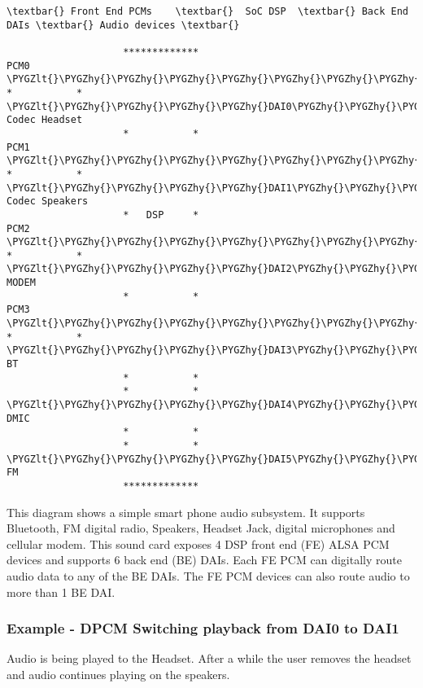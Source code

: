 \documentclass[a4paper,8pt,english]{sphinxmanual}
\def\PYGZlt{\char`\<}
\def\PYGZgt{\char`\>}
\def\PYGZhy{\char`\-}
\begin{document}
\begin{Verbatim}[commandchars=\\\{\}]
\textbar{} Front End PCMs    \textbar{}  SoC DSP  \textbar{} Back End DAIs \textbar{} Audio devices \textbar{}

                    *************
PCM0 \PYGZlt{}\PYGZhy{}\PYGZhy{}\PYGZhy{}\PYGZhy{}\PYGZhy{}\PYGZhy{}\PYGZhy{}\PYGZhy{}\PYGZhy{}\PYGZhy{}\PYGZhy{}\PYGZhy{}\PYGZgt{} *           * \PYGZlt{}\PYGZhy{}\PYGZhy{}\PYGZhy{}\PYGZhy{}DAI0\PYGZhy{}\PYGZhy{}\PYGZhy{}\PYGZhy{}\PYGZhy{}\PYGZgt{} Codec Headset
                    *           *
PCM1 \PYGZlt{}\PYGZhy{}\PYGZhy{}\PYGZhy{}\PYGZhy{}\PYGZhy{}\PYGZhy{}\PYGZhy{}\PYGZhy{}\PYGZhy{}\PYGZhy{}\PYGZhy{}\PYGZhy{}\PYGZgt{} *           * \PYGZlt{}\PYGZhy{}\PYGZhy{}\PYGZhy{}\PYGZhy{}DAI1\PYGZhy{}\PYGZhy{}\PYGZhy{}\PYGZhy{}\PYGZhy{}\PYGZgt{} Codec Speakers
                    *   DSP     *
PCM2 \PYGZlt{}\PYGZhy{}\PYGZhy{}\PYGZhy{}\PYGZhy{}\PYGZhy{}\PYGZhy{}\PYGZhy{}\PYGZhy{}\PYGZhy{}\PYGZhy{}\PYGZhy{}\PYGZhy{}\PYGZgt{} *           * \PYGZlt{}\PYGZhy{}\PYGZhy{}\PYGZhy{}\PYGZhy{}DAI2\PYGZhy{}\PYGZhy{}\PYGZhy{}\PYGZhy{}\PYGZhy{}\PYGZgt{} MODEM
                    *           *
PCM3 \PYGZlt{}\PYGZhy{}\PYGZhy{}\PYGZhy{}\PYGZhy{}\PYGZhy{}\PYGZhy{}\PYGZhy{}\PYGZhy{}\PYGZhy{}\PYGZhy{}\PYGZhy{}\PYGZhy{}\PYGZgt{} *           * \PYGZlt{}\PYGZhy{}\PYGZhy{}\PYGZhy{}\PYGZhy{}DAI3\PYGZhy{}\PYGZhy{}\PYGZhy{}\PYGZhy{}\PYGZhy{}\PYGZgt{} BT
                    *           *
                    *           * \PYGZlt{}\PYGZhy{}\PYGZhy{}\PYGZhy{}\PYGZhy{}DAI4\PYGZhy{}\PYGZhy{}\PYGZhy{}\PYGZhy{}\PYGZhy{}\PYGZgt{} DMIC
                    *           *
                    *           * \PYGZlt{}\PYGZhy{}\PYGZhy{}\PYGZhy{}\PYGZhy{}DAI5\PYGZhy{}\PYGZhy{}\PYGZhy{}\PYGZhy{}\PYGZhy{}\PYGZgt{} FM
                    *************
\end{Verbatim}

This diagram shows a simple smart phone audio subsystem. It supports Bluetooth,
FM digital radio, Speakers, Headset Jack, digital microphones and cellular
modem. This sound card exposes 4 DSP front end (FE) ALSA PCM devices and
supports 6 back end (BE) DAIs. Each FE PCM can digitally route audio data to any
of the BE DAIs. The FE PCM devices can also route audio to more than 1 BE DAI.


\subsubsection{Example - DPCM Switching playback from DAI0 to DAI1}
\label{sound/soc/dpcm:example-dpcm-switching-playback-from-dai0-to-dai1}
Audio is being played to the Headset. After a while the user removes the headset
and audio continues playing on the speakers.
\end{document}
